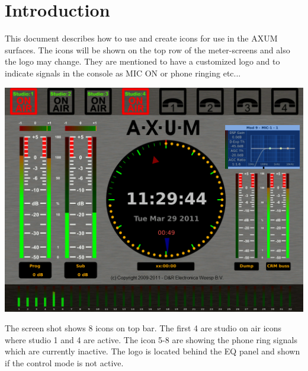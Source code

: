 \chapter{Introduction}
This document describes how to use and create icons for use in the AXUM surfaces. The icons will be shown on the top row of the meter-screens and also the logo may change. They are mentioned to have a customized logo and to indicate signals in the console as MIC ON or phone ringing etc...

\vspace{5mm}

\includegraphics[width=13.5cm]{meter_screen.png}

\vspace{5mm}

The screen shot shows 8 icons on top bar. The first 4 are studio on air icons where studio 1 and 4 are active. The icon 5-8 are showing the phone ring signals which are currently inactive. The logo is located behind the EQ panel and shown if the control mode is not active.
